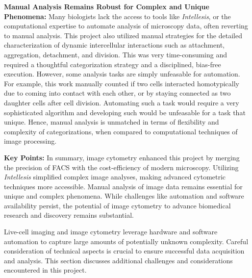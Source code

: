 \textbf{Manual Analysis Remains Robust for Complex and Unique Phenomena:}
Many biologists lack the access to tools like \textit{Intellesis}, or the
computational expertise to automate analysis of microscopy data, often reverting
to manual analysis. This project also utilized manual strategies for the
detailed characterization of dynamic intercellular interactions such as
attachment, aggregation, detachment, and division. This was very time-consuming
and required a thoughtful categorization strategy and a disciplined, bias-free
execution. However, some analysis tasks are simply unfeasable for automation.
For example, this work manually counted if two \INA cells interacted
homotypically due to coming into contact with each other, or by staying
connected as two daughter cells after cell division. Automating such a task
would require a very sophisticated algorithm and developing such would be
unfeasable for a task that unique. Hence, manual analysis is unmatched in terms
of flexibility and complexity of categorizations, when compared to computational
techniques of image processing.





\textbf{Key Points:} In summary, image cytometry enhanced this
project by merging the precision of \ac{FACS} with the cost-efficiency of modern
microscopy. Utilizing \textit{Intellesis} simplified complex image analyses,
making advanced cytometric techniques more accessible. Manual analysis of image
data remains essential for unique and complex phenomena. While challenges like
automation and software availability persist, the potential of image cytometry
to advance biomedical research and discovery remains substantial.




%
\label{sec:discussion_quantifying_microscopy}%
Live-cell imaging and image cytometry leverage hardware and software automation
to capture large amounts of potentially unknown complexity. Careful
consideration of technical aspects is crucial to ensure successful data
acquisition and analysis. This section discusses additional challenges and
considerations encountered in this project.

